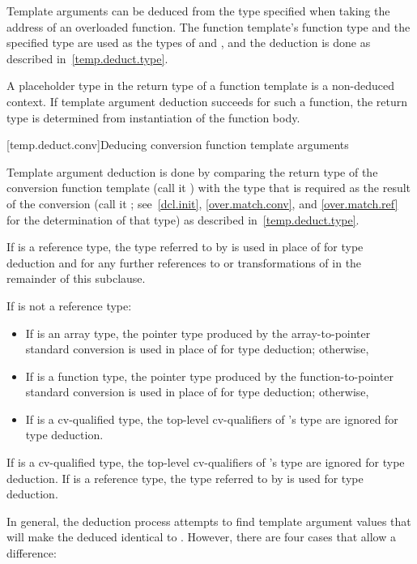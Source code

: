 \pnum
Template arguments can be deduced from the type specified when taking
the address of an overloaded function.
The function template's function type and the specified type
are used as the types of
and
,
and the deduction is done as
described in~\ref{temp.deduct.type}.

\pnum
A placeholder type in the return type of a
function template is a non-deduced context. If template argument
deduction succeeds for such a function, the return type is determined
from instantiation of the function body.

[temp.deduct.conv]{Deducing conversion function template arguments}

\pnum
Template argument deduction is done by comparing the return type of
the
conversion function template
(call it
)
with the type that is
required as the result of the conversion (call it
; see~\ref{dcl.init}, \ref{over.match.conv}, and \ref{over.match.ref}
for the determination of that type)
as described in~\ref{temp.deduct.type}.

\pnum
If  is a reference type, the type referred to by  is used in place
of  for type deduction and for any further references to or transformations of
 in the remainder of this subclause.

\pnum
If
is not a reference type:

\begin{itemize}
\item
If
is an array type, the pointer type produced by the
array-to-pointer standard conversion is used in place of
for type
deduction; otherwise,
\item
If
is a function type, the pointer type produced by the
function-to-pointer standard conversion is used in place of
for
type deduction; otherwise,
\item
If
is a cv-qualified type, the top-level cv-qualifiers of
's
type are ignored for type deduction.
\end{itemize}

\pnum
If
is a cv-qualified type, the top-level cv-qualifiers of
's
type are ignored for type deduction.
If
is a
reference type, the type referred to by
is used for type deduction.

\pnum
In general, the deduction process attempts to find template argument
values that will make the deduced
identical to
.
However, there are four cases that allow a difference:

